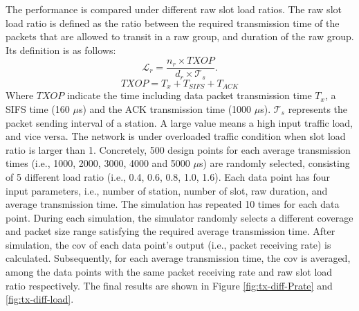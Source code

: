 The performance is compared under different \gls{raw} slot load ratios. The \gls{raw} slot load ratio is defined as the ratio between the required transmission time of the 
packets that are allowed to transit in a \gls{raw} group, and duration of the \gls{raw} group. Its definition is as follows:
 \\
\begin{equation}
\mathcal{L}_{r} = \frac {n_r \times TXOP} {d_r \times \mathcal{T}_s}. 
\end{equation}
\begin{equation}
TXOP = T_x + T_{SIFS} +  T_{ACK}
\end{equation}
Where $TXOP$ indicate the time including data packet transmission time $T_x$, a SIFS time (160 $\mu$s) and the ACK transmission time (1000 $\mu$s). $\mathcal{T}_s$ represents the packet sending interval of a station. A large value means a high input traffic load, and vice versa. The network is under overloaded traffic condition when slot load ratio is larger than 1.
Concretely, 500 design points for each average transmission times (i.e., 1000, 2000, 3000, 4000 and 5000 $\mu$s) are randomly selected, 
consisting of 5 different load ratio (i.e., 0.4, 0.6, 0.8, 1.0, 1.6). Each data point has four input parameters, i.e., number of station, number of slot, \gls{raw} duration, and average transmission time. The simulation has repeated 10 times for each data point. During each simulation, the simulator randomly selects a different coverage and packet size range satisfying the required average transmission time. After simulation, the \gls{cov} of each data point's output (i.e., packet receiving rate) is calculated. Subsequently, for each average transmission time, the \gls{cov} is averaged, among the data points with the same packet receiving rate and \gls{raw} slot load ratio respectively. The final results are shown in Figure \ref{fig:tx-diff-Prate} and \ref{fig:tx-diff-load}. 




